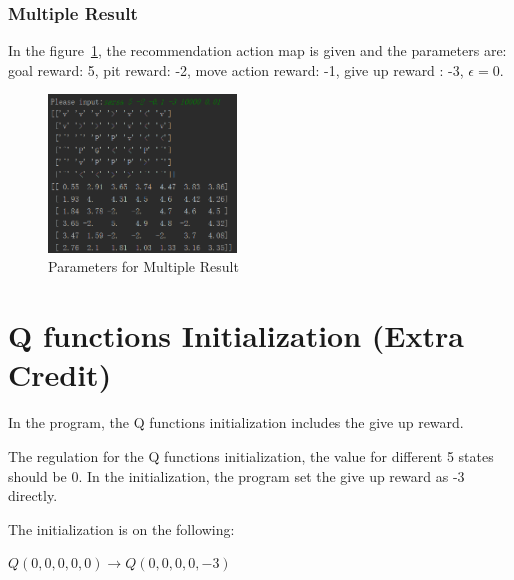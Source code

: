 \documentclass[11pt, a4paper]{article}
\begin{document}
\newpage

\subsubsection{Multiple Result}

In the figure~\ref{fig:5_b}, the recommendation action map is given and the parameters are: goal reward: 5, pit reward: -2, move action reward: -1, give up reward : -3, $\epsilon = 0.$


\begin{figure}[htbp] 
	\begin{center}
		\includegraphics[width=5cm]{4_map} 
		\caption{Parameters for Multiple Result} 
		\label{fig:5_b}
	\end{center}
\end{figure}



\section{Q functions Initialization (Extra Credit)}

In the program, the Q functions initialization includes the give up reward.
 
The regulation for the Q functions initialization, the value for different 5 states should be 0. In the initialization, the program set the give up reward as -3 directly. 

The initialization is on the following:

$Q(0,0,0,0,0) \rightarrow Q(0,0,0,0,-3)$ 

\end{document}
